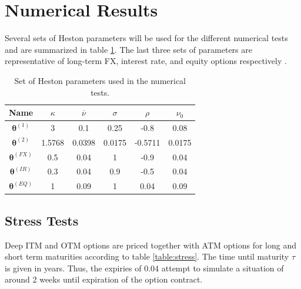 \documentclass[12,twoside]{mammeTFM}
\theoremstyle{definition}
\theoremstyle{remark}
\begin{document}


\section{Numerical Results} \label{chapter:results}

Several sets of Heston parameters will be used for the different numerical tests and are summarized in table \ref{table:heston_params}. The last three sets of parameters are representative of long-term FX, interest rate, and equity options respectively \cite{and08}.

\begin{table}[h]
\begin{center}
 \begin{tabular}{|c | c | c | c | c | c |} 
 \hline
 Name & $\kappa$ & $\overline{\nu}$ & $\sigma$ & $\rho$ & $\nu_0$ \\ [0.5ex] 
 \hline
 $\boldsymbol{\theta}^{(1)}$ & 3 & 0.1 & 0.25 & -0.8 & 0.08 \\ 
 \hline
 $\boldsymbol{\theta}^{(2)}$ & 1.5768 & 0.0398 & 0.0175 & -0.5711 & 0.0175 \\ 
 \hline
 $\boldsymbol{\theta}^{(FX)}$ & 0.5 & 0.04 & 1 & -0.9 & 0.04 \\ 
 \hline
 $\boldsymbol{\theta}^{(IR)}$ & 0.3 & 0.04 & 0.9 & -0.5 & 0.04 \\ 
 \hline
 $\boldsymbol{\theta}^{(EQ)}$ & 1 & 0.09 & 1 & 0.04 & 0.09 \\ 
 \hline
\end{tabular}
\end{center}
\caption{Set of Heston parameters used in the numerical tests.}\label{table:heston_params}
\end{table}

\subsection{Stress Tests}

Deep ITM and OTM options are priced together with ATM options for long and short term maturities according to table \ref{table:stress}. The time until maturity $\tau$ is given in years. Thus, the expiries of 0.04 attempt to simulate a situation of around 2 weeks until expiration of the option contract.
\end{document}
